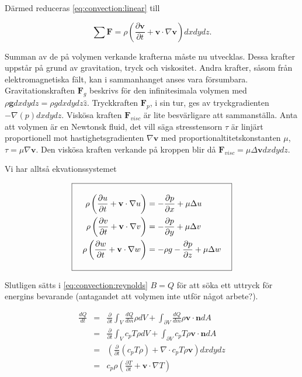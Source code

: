 Därmed reduceras \eqref{eq:convection:linear} till

\begin{equation}
\label{eq:convection:linearfinal}
\sum \mathbf{F} = \rho \left( \frac{\partial \mathbf{v}}{\partial t} + \mathbf{v}\cdot \nabla\mathbf{v} \right)dxdydz.
\end{equation}

Summan av de på volymen verkande krafterna måste nu utvecklas. Dessa krafter uppstår på grund av gravitation, tryck och viskositet. Andra krafter, såsom från elektromagnetiska fält, kan i sammanhanget anses vara försumbara. Gravitationskraften $\mathbf{F}_g$ beskrivs för den infinitesimala volymen med $\rho \mathbf{g} dxdydz = \rho g dxdydz \hat{z}$. Tryckkraften $\mathbf{F}_p$, i sin tur, ges av tryckgradienten $-\nabla \left( p \right) dxdydz$. Viskösa kraften $\mathbf{F}_{visc}$ är lite besvärligare att sammanställa. Anta att volymen är en Newtonsk fluid, det vill säga stresstensorn $\tau$ är linjärt proportionell mot hastighetsgradienten $\nabla\mathbf{v}$ med proportionaltitetskonstanten $\mu$, $\tau = \mu \nabla \mathbf{v}$. Den viskösa kraften verkande på kroppen blir då $\mathbf{F}_{visc} = \mu\Delta\mathbf{v}dxdydz$.


Vi har alltså ekvationssystemet

\begin{equation}
\label{eq:convection:momentum}
\addtolength{\fboxsep}{10pt} 
\boxed{ 
\begin{split} 
\rho\left(\frac{\partial u}{\partial t} + \mathbf{v}\cdot \nabla u\right) & = -\frac{\partial p}{\partial x} + \mu\Delta u\\
\rho\left(\frac{\partial v}{\partial t} + \mathbf{v}\cdot \nabla v\right) & = -\frac{\partial p}{\partial y} + \mu\Delta v\\
\rho\left(\frac{\partial w}{\partial t} + \mathbf{v}\cdot \nabla w\right) & = -\rho g -\frac{\partial p}{\partial z} + \mu\Delta w  
\end{split} 
} 
\end{equation}


Slutligen sätts i \ref{eq:convection:reynolds} $B=Q$ för att söka ett uttryck för energins bevarande (antagandet att volymen inte utför något arbete?).

\begin{eqnarray}
\label{reynoldsenergyone}
\frac{dQ}{dt} & = & \frac{\partial}{\partial t} \int_V \frac{dQ}{dm}\rho dV + \int_{\partial V}\frac{dQ}{dm}\rho \mathbf{v} \cdot \mathbf{n} dA \nonumber\\
& = & \frac{\partial}{\partial t} \int_V c_p T \rho dV + \int_{\partial V} c_p T \rho \mathbf{v} \cdot \mathbf{n} dA \nonumber\\
& = & \left(\frac{\partial}{\partial t} \left( c_p T \rho \right) + \nabla\cdot c_p T \rho \mathbf{v}\right) dxdydz \nonumber\\
& = & c_p \rho \left( \frac{\partial T}{\partial t} + \mathbf{v}\cdot \nabla T\right)
\end{eqnarray}

